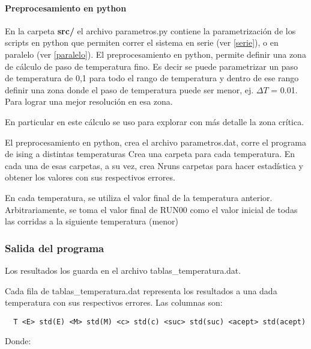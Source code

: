 \paragraph{Preprocesamiento en python}
En la carpeta \textbf{src/} el archivo parametros.py contiene la parametrizaci\'on 
de los scripts
en python que permiten correr el sistema en serie (ver \ref{serie}), 
o en paralelo (ver \ref{paralelo}).
El preprocesamiento en python, permite definir una zona de c\'alculo de paso
de temperatura fino. Es decir se puede parametrizar un paso de temperatura de
0,1 para todo el rango de temperatura y dentro de ese rango definir una zona
donde el paso de temperatura puede ser menor, ej. $\Delta T$ = 0.01. Para lograr una mejor resoluci\'on
en esa zona.

En particular en este c\'alculo se uso para explorar con m\'as detalle la zona
cr\'itica.

El preprocesamiento en python, crea el archivo parametros.dat, 
 corre el programa de ising a distintas temperaturas
  Crea una carpeta para cada temperatura. En cada una de esas carpetas, a su
  vez, crea Nruns carpetas para hacer estadística y obtener los valores con
  sus respectivos errores.
 
  En cada temperatura, se utiliza el valor final de la temperatura anterior.
  Arbitrariamente, se toma el valor final de RUN00 como el valor inicial de
  todas las corridas a la siguiente temperatura (menor)
 

\subsubsection{Salida del programa}

Los resultados los guarda en el archivo tablas\_temperatura.dat.

Cada fila de tablas\_temperatura.dat representa los resultados a una dada
temperatura con sus respectivos errores. Las columnas son:

\begin{verbatim}
  T <E> std(E) <M> std(M) <c> std(c) <suc> std(suc) <acept> std(acept)
\end{verbatim}

Donde:



